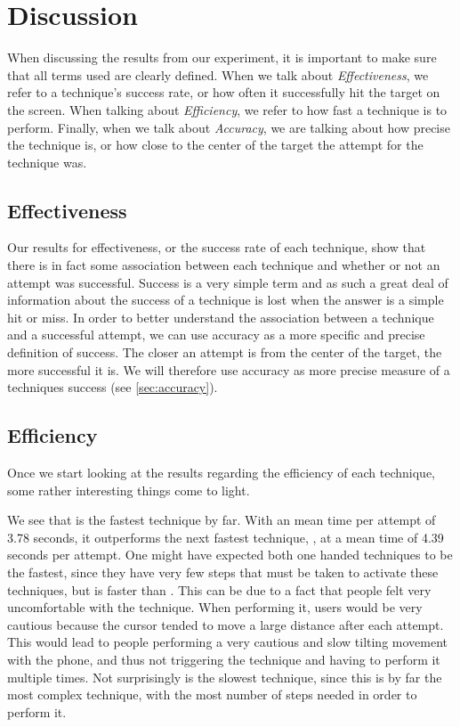 \section{Discussion}\label{sec:discussion}
When discussing the results from our experiment, it is important to make sure that all terms used are clearly defined. When we talk about \emph{Effectiveness}, we refer to a technique's success rate, or how often it successfully hit the target on the screen. When talking about \emph{Efficiency}, we refer to how fast a technique is to perform. Finally, when we talk about \emph{Accuracy}, we are talking about how precise the technique is, or how close to the center of the target the attempt for the technique was. 

\subsection{Effectiveness}

Our results for effectiveness, or the success rate of each technique, show that there is in fact some association between each technique and whether or not an attempt was successful.
Success is a very simple term and as such a great deal of information about the success of a technique is lost when the answer is a simple hit or miss. 
In order to better understand the association between a technique and a successful attempt, we can use accuracy as a more specific and precise definition of success.
The closer an attempt is from the center of the target, the more successful it is.
We will therefore use accuracy as more precise measure of a techniques success (see \cref{sec:accuracy}).


\subsection{Efficiency}

Once we start looking at the results regarding the efficiency of each technique, some rather interesting things come to light.

We see that \swipe is the fastest technique by far.
With an mean time per attempt of 3.78 seconds, it outperforms the next fastest technique, \throw, at a mean time of 4.39 seconds per attempt. 
One might have expected both one handed techniques to be the fastest, since they have very few steps that must be taken to activate these techniques, but \throw is faster than \tilt. 
This can be due to a fact that people felt very uncomfortable with the \tilt technique.
When performing it, users would be very cautious because the cursor tended to move a large distance after each attempt.
This would lead to people performing a very cautious and slow tilting movement with the phone, and thus not triggering the technique and having to perform it multiple times. 
Not surprisingly \grab is the slowest technique, since this is by far the most complex technique, with the most number of steps needed in order to perform it.

